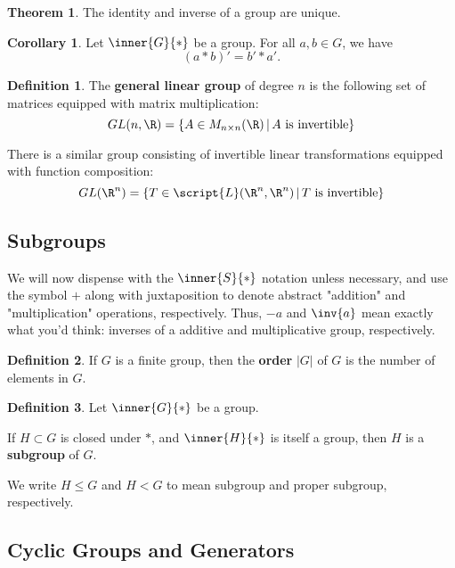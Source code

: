 \documentclass[a5paper]{article}
\theoremstyle{definition}%
\newtheorem*{theorem*}{Theorem} %
\newtheorem{corollary}[theorem]{Corollary}
\newtheorem*{definition*}{Definition}
\numberwithin{exercise}{section}
\theoremstyle{remark}%
\begin{document}
\begin{theorem*}
The identity and inverse of a group are unique.
\end{theorem*}

\begin{corollary}
Let $\inner{G}{*}$ be a group. For all $a,b\in G$, we have 
$$(a*b)'=b'*a'.$$
\end{corollary}

\begin{highlight}
\begin{definition*}
The \textbf{general linear group} of degree $n$ is the following set of matrices equipped with matrix multiplication:
$$GL(n,\R)=\{A\in M_{n\times n}(\R)\,|\,A \text{ is invertible}\}$$

\noindent There is a similar group consisting of invertible linear transformations equipped with function composition:
$$GL(\R^n)=\{T\in\script{L}(\R^n,\R^n)\,|\,T \text{ is invertible}\}$$
\end{definition*}
\end{highlight}


\subsection{Subgroups}

We will now dispense with the $\inner{S}{*}$ notation unless necessary, and use the symbol $+$ along with juxtaposition to denote abstract "addition" and "multiplication" operations, respectively. Thus, $-a$ and $\inv{a}$ mean exactly what you'd think: inverses of a additive and multiplicative group, respectively.

\begin{definition*}
If $G$ is a finite group, then the \textbf{order} $|G|$ of $G$ is the number of elements in $G$. 
\end{definition*}

\begin{highlight}
\begin{definition*}
Let $\inner{G}{*}$ be a group. 

If $H\subset G$ is closed under $*$, and $\inner{H}{*}$ is itself a group, then $H$ is a \textbf{subgroup} of $G$. 

We write $H\leq G$ and $H<G$ to mean subgroup and proper subgroup, respectively. 
\end{definition*}
\end{highlight}

\pagebreak
\subsection{Cyclic Groups and Generators}
\end{document}
